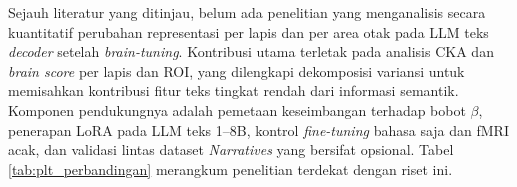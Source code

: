 Sejauh literatur yang ditinjau, belum ada penelitian yang menganalisis secara kuantitatif perubahan representasi per lapis dan per area otak pada LLM teks \textit{decoder} setelah \textit{brain-tuning}. Kontribusi utama terletak pada analisis CKA dan \textit{brain score} per lapis dan ROI, yang dilengkapi dekomposisi variansi untuk memisahkan kontribusi fitur teks tingkat rendah dari informasi semantik. Komponen pendukungnya adalah pemetaan keseimbangan terhadap bobot $\beta$, penerapan LoRA pada LLM teks 1--8B, kontrol \textit{fine-tuning} bahasa saja dan fMRI acak, dan validasi lintas dataset \textit{Narratives} yang bersifat opsional. Tabel \ref{tab:plt_perbandingan} merangkum penelitian terdekat dengan riset ini.







